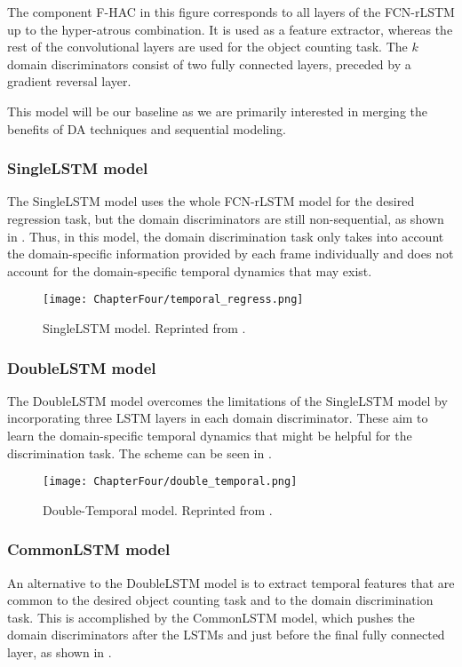 The component F-HAC in this figure corresponds to all layers of the FCN-rLSTM up to the hyper-atrous combination. It is used as a feature extractor, whereas the rest of the convolutional layers are used for the object counting task. The $k$ domain discriminators consist of two fully connected layers, preceded by a gradient reversal layer.

This model will be our baseline as we are primarily interested in merging the benefits of DA techniques and sequential modeling.

\subsubsection{SingleLSTM model}
The SingleLSTM model uses the whole FCN-rLSTM model for the desired regression task, but the domain discriminators are still non-sequential, as shown in . Thus, in this model, the domain discrimination task only takes into account the domain-specific information provided by each frame individually and does not account for the domain-specific temporal dynamics that may exist.

\begin{figure}[h!]
    \centering
    \texttt{[image: ChapterFour/temporal\_regress.png]}
    \caption{SingleLSTM model. Reprinted from \citet{ThesisFrancisco}.}
    \label{fig:temporal_regress_model}
\end{figure}

\subsubsection{DoubleLSTM model}
The DoubleLSTM model overcomes the limitations of the SingleLSTM model by incorporating three LSTM layers in each domain discriminator. These aim to learn the domain-specific temporal dynamics that might be helpful for the discrimination task. The scheme can be seen in .

\begin{figure}[!ht]
    \centering
    \texttt{[image: ChapterFour/double\_temporal.png]}
    \caption{Double-Temporal model. Reprinted from \citet{ThesisFrancisco}.}
    \label{fig:double_temporal_model}
\end{figure}

\subsubsection{CommonLSTM model}
An alternative to the DoubleLSTM model is to extract temporal features that are common to the desired object counting task and to the domain discrimination task. This is accomplished by the CommonLSTM model, which pushes the domain discriminators after the LSTMs and just before the final fully connected layer, as shown in .

